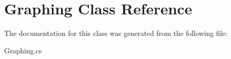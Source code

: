 \hypertarget{class_graphing}{}\section{Graphing Class Reference}
\label{class_graphing}


The documentation for this class was generated from the following file\+:\begin{DoxyCompactItemize}
\item 
Graphing.\+cs\end{DoxyCompactItemize}
